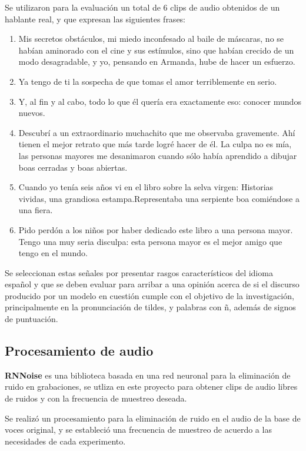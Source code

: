 Se utilizaron para la evaluación un total de 6 clips de audio obtenidos de un hablante real, y que expresan las siguientes frases:
\begin{enumerate}
	\item Mis secretos obstáculos, mi miedo inconfesado al baile de máscaras, no se habían aminorado con el cine y sus estímulos, sino que habían crecido de un modo desagradable, y yo, pensando en Armanda, hube de hacer un esfuerzo. \label{sentence1}
	\item Ya tengo de ti la sospecha de que tomas el amor terriblemente en serio. \label{sentence2}
	\item Y, al fin y al cabo, todo lo que él quería era exactamente eso: conocer mundos nuevos. \label{sentence3}
	\item Descubrí a un extraordinario muchachito que me observaba gravemente. Ahí tienen el mejor retrato que más tarde logré hacer de él. La culpa no es mía, las personas mayores me desanimaron cuando sólo había aprendido a dibujar boas cerradas y boas abiertas. \label{sentence4}
	\item Cuando yo tenía seis años vi en el libro sobre la selva virgen: Historias vividas, una grandiosa estampa.Representaba una serpiente boa comiéndose a una fiera. \label{sentence5}
	\item Pido perdón a los niños por haber dedicado este libro a una persona mayor. Tengo una muy seria disculpa: esta persona mayor es el mejor amigo que tengo en el mundo. \label{sentence6}
\end{enumerate}

Se seleccionan estas señales por presentar rasgos característicos del idioma español y que se deben evaluar para arribar a una opinión acerca de si el discurso producido por un modelo en cuestión cumple con el objetivo de la investigación, principalmente en la pronunciación de tildes, y palabras con ñ, además de signos de puntuación.  



\subsection{Procesamiento de audio}

\textbf{RNNoise} es una biblioteca basada en una red neuronal para la eliminación de ruido en grabaciones, se utliza en este proyecto para obtener clips de audio libres de ruidos y con la frecuencia de muestreo deseada.

Se realizó un procesamiento para la eliminación de ruido en el audio de la base de voces original, y se estableció una frecuencia de muestreo de acuerdo a las necesidades de cada experimento. 

